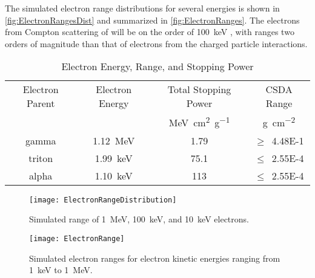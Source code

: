 The simulated electron range distributions for several energies is shown in \autoref{fig:ElectronRangesDist} and summarized in \autoref{fig:ElectronRanges}.
The electrons  from Compton scattering of  will be on the order of \SI{100}{\keV} , with ranges two orders of magnitude than that of electrons from the charged particle interactions.
\begin{table}[ht]
  \caption[Electron Energy, Range, and Stopping Power]{Electron Energy, Range, and Stopping Power \protect\cite{berger_estar_2005,turner_atoms_2008}}
	\centering
	\begin{tabular}{c | c S c}
	\toprule
	{Electron Parent} & {Electron Energy} & {Total Stopping Power} & {CSDA Range} \\
	 &  & \si{\mega\eV \cm\squared \per \gram} & \si{\gram\per\cm\squared} \\
	\midrule
	{gamma}  & \SI{1.12}{\mega\eV} & 1.79 & $\ge$~\num{4.48E-1} \\
	{triton} & \SI{1.99}{\kilo\eV} & 75.1 & $\le$~\num{2.55E-4} \\
	{alpha}  & \SI{1.10}{\kilo\eV} & 113  & $\le$~\num{2.55E-4} \\
	\bottomrule
	\end{tabular}
  \label{tab:BasicEDepOutline}
\end{table}
\begin{figure}
  \centering
      \texttt{[image: ElectronRangeDistribution]}
      \caption[Simulated Electron Ranges Distrubtions in Polystyrene]{Simulated range of \SI{1}{\MeV}, \SI{100}{\keV}, and \SI{10}{\keV} electrons.\rangeSimGeo}
      \label{fig:ElectronRangesDist}
\end{figure}
\begin{figure}
	\centering
      \texttt{[image: ElectronRange]}
  \caption[Simulated Electron Ranges in Polystyrene]{Simulated electron ranges for electron kinetic energies ranging from \SI{1}{\keV} to \SI{1}{\MeV}.\rangeSimGeo} 
  \label{fig:ElectronRanges}
\end{figure}


